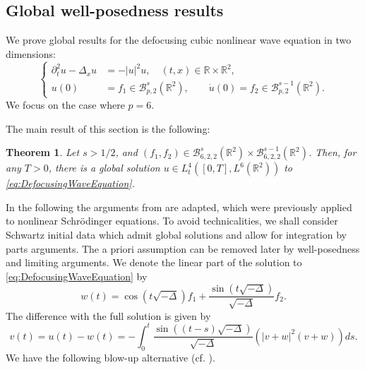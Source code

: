 \documentclass{amsart}
\newtheorem{theorem}{Theorem}[section]
\theoremstyle{definition}
\newcommand{\R}{\mathbb{R}}
\numberwithin{equation}{section}
\begin{document}
\subsection{Global well-posedness results}
\label{subsection:GlobalNLW}
We prove global results for the defocusing cubic nonlinear wave equation in two dimensions:
\begin{equation}
\label{eq:DefocusingWaveEquation}
\left\{ \begin{array}{cl}
\partial_t^2 u - \Delta_{x} u &= -|u|^2 u, \quad (t,x) \in \R \times \R^2, \\
u(0) &= f_1 \in \mathcal{B}^{s}_{p,2}(\R^2), \qquad \dot{u}(0) = f_2 \in \mathcal{B}^{s-1}_{p,2}(\R^2).
\end{array} \right.
\end{equation}
We focus on the case where $p=6$.

The main result of this section is the following:
\begin{theorem}
\label{thm:GlobalNLW}
Let $s > 1/2$, and $(f_1,f_2) \in \mathcal{B}^{s}_{6,2,2}(\R^2) \times \mathcal{B}^{s-1}_{6,2,2}(\R^2)$. Then, for any $T>0$, there is a global solution $u \in L_t^4([0,T],L^6(\R^2))$ to \eqref{eq:DefocusingWaveEquation}.
\end{theorem}

In the following the arguments from \cite{Schippa2022} are adapted, which were previously applied to nonlinear Schr\"odinger equations. To avoid technicalities, we shall consider Schwartz initial data which admit global solutions and allow for integration by parts arguments. The a priori assumption can be removed later by well-posedness and limiting arguments.
We denote the linear part of the solution to \eqref{eq:DefocusingWaveEquation} by
\begin{equation*}
w(t) = \cos(t \sqrt{- \Delta}) f_1 + \frac{\sin (t \sqrt{- \Delta})}{\sqrt{- \Delta}} f_2.
\end{equation*}
The difference with the full solution is given by
\begin{equation}
\label{eq:Difference}
v(t) = u(t) - w(t) = - \int_0^t \frac{\sin((t-s) \sqrt{-\Delta})}{\sqrt{- \Delta}} (|v+w|^2 (v+w)) ds.
\end{equation}
We have the following blow-up alternative (cf. \cite[Lemma~4.9]{Schippa2022}).
\end{document}
